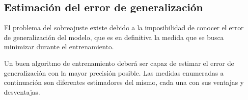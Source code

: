 %
%
\subsection{Estimación del error de generalización}
%
El problema del sobreajuste existe debido a la imposibilidad de
conocer el error de generalización del modelo, que es en definitiva la
medida que se busca minimizar durante el entrenamiento.

Un buen algoritmo de entrenamiento deberá ser capaz de estimar el
error de generalización con la mayor precisión posible. Las medidas
enumeradas a continuación son diferentes estimadores del mismo, cada
una con sus ventajas y desventajas.
